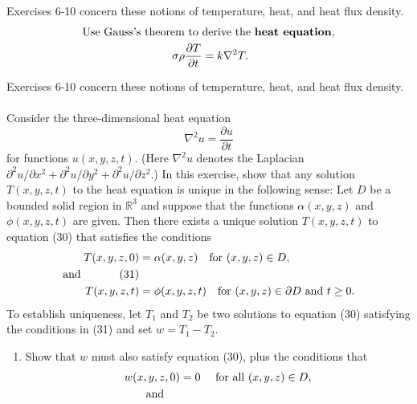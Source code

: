 \documentclass[12pt,letterpaper]{hmcpset}
\newcommand{\p}[2]{\frac{\partial#1}{\partial#2}}
\newcommand{\bb}[1]{\mathbb{#1}}
\begin{document}
\begin{problem}[Colley 7.4.6]
    Exercises 6-10 concern these notions of temperature, heat, and
    heat flux density.
    \begin{align*}
        \text{Use Gauss's theorem to }&\text{derive the
        \textbf{heat equation},}\\
        \sigma\rho\p{T}{t}&=k\nabla^2T.
    \end{align*}
\end{problem}
\begin{solution}
    \vfill
\end{solution}
\newpage

\begin{problem}[Colley 7.4.10]
    Exercises 6-10 concern these notions of temperature, heat, and
    heat flux density.\\\\
    Consider the three-dimensional heat equation
    \begin{equation}\tag{30}
        \nabla^2u=\p{u}{t}
    \end{equation}
    for functions $u(x,y,z,t)$. (Here $\nabla^2u$ denotes the
    Laplacian $\partial^2u/\partial x^2+\partial^2 u/\partial
    y^2+\partial^2u/\partial z^2$.) In this exercise, show that any
    solution $T(x,y,z,t)$ to the heat equation is unique in the
    following sense: Let $D$ be a bounded solid region in $\bb{R}^3$
    and suppose that the functions $\alpha(x,y,z)$ and $\phi(x,y,z,t)$
    are given. Then there exists a unique solution $T(x,y,z,t)$ to
    equation (30) that satisfies the conditions
    \begin{align*}
        T(x,y,z,0)&=\alpha(x,y,z)\quad\text{for }(x,y,z)\in D,\\
        \text{and}\hspace{5mm}\tag{31}\\
        T(x,y,z,t)&=\phi(x,y,z,t)\quad\text{for }(x,y,z)\in \partial D
        \text{ and }t\geq0.
    \end{align*}
    To establish uniqueness, let $T_1$ and $T_2$ be two solutions to
    equation (30) satisfying the conditions in (31) and set
    $w=T_1-T_2$.
    \begin{enumerate}
        \item Show that $w$ must also satisfy equation (30), plus the
            conditions that
            \begin{align*}
                w(x,y,z,0)&=0\quad\text{ for all }(x,y,z)\in D,\\
                \text{and}\hspace{5mm}\\

\end{align*}
\end{enumerate}
\end{problem}
\end{document}
